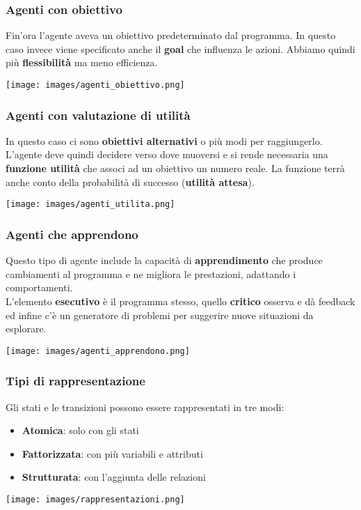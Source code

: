 \subsubsection{Agenti con obiettivo}
Fin'ora l'agente aveva un obiettivo predeterminato dal programma. In questo caso invece viene specificato anche il \textbf{goal} che influenza le azioni. Abbiamo quindi più \textbf{flessibilità} ma meno efficienza.
\begin{center}
	\texttt{[image: images/agenti\_obiettivo.png]}
\end{center}

\subsubsection{Agenti con valutazione di utilità}
In questo caso ci sono \textbf{obiettivi alternativi} o più modi per raggiungerlo. L'agente deve quindi decidere verso dove muoversi e si rende necessaria una \textbf{funzione utilità} che associ ad un obiettivo un numero reale. La funzione terrà anche conto della probabilità di successo (\textbf{utilità attesa}).
\begin{center}
	\texttt{[image: images/agenti\_utilita.png]}
\end{center}

\subsubsection{Agenti che apprendono}
Questo tipo di agente include la capacità di \textbf{apprendimento} che produce cambiamenti al programma e ne migliora le prestazioni, adattando i comportamenti.\\
L'elemento \textbf{esecutivo} è il programma stesso, quello \textbf{critico} osserva e dà feedback ed infine c'è un generatore di problemi per suggerire nuove situazioni da esplorare.
\begin{center}
	\texttt{[image: images/agenti\_apprendono.png]}
\end{center}

\subsubsection{Tipi di rappresentazione}
Gli stati e le transizioni possono essere rappresentati in tre modi:
\begin{itemize}
	\item \textbf{Atomica}: solo con gli stati
	\item \textbf{Fattorizzata}: con più variabili e attributi
	\item \textbf{Strutturata}: con l'aggiunta delle relazioni
\end{itemize}
\begin{center}
	\texttt{[image: images/rappresentazioni.png]}
\end{center}